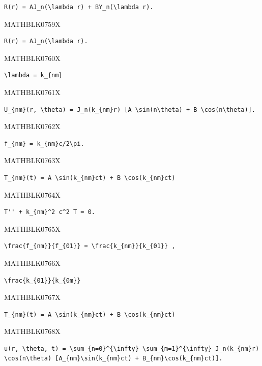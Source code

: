 \documentclass[
  ukrainian,
]{article}
\begin{document}
\begin{verbatim}
R(r) = AJ_n(\lambda r) + BY_n(\lambda r).
\end{verbatim}

MATHBLK0759X

\begin{verbatim}
R(r) = AJ_n(\lambda r).
\end{verbatim}

MATHBLK0760X

\begin{verbatim}
\lambda = k_{nm}
\end{verbatim}

MATHBLK0761X

\begin{verbatim}
U_{nm}(r, \theta) = J_n(k_{nm}r) [A \sin(n\theta) + B \cos(n\theta)].
\end{verbatim}

MATHBLK0762X

\begin{verbatim}
f_{nm} = k_{nm}c/2\pi.
\end{verbatim}

MATHBLK0763X

\begin{verbatim}
T_{nm}(t) = A \sin(k_{nm}ct) + B \cos(k_{nm}ct)
\end{verbatim}

MATHBLK0764X

\begin{verbatim}
T'' + k_{nm}^2 c^2 T = 0.
\end{verbatim}

MATHBLK0765X

\begin{verbatim}
\frac{f_{nm}}{f_{01}} = \frac{k_{nm}}{k_{01}} ,
\end{verbatim}

MATHBLK0766X

\begin{verbatim}
\frac{k_{01}}{k_{0m}}
\end{verbatim}

MATHBLK0767X

\begin{verbatim}
T_{nm}(t) = A \sin(k_{nm}ct) + B \cos(k_{nm}ct)
\end{verbatim}

MATHBLK0768X

\begin{verbatim}
u(r, \theta, t) = \sum_{n=0}^{\infty} \sum_{m=1}^{\infty} J_n(k_{nm}r) \cos(n\theta) [A_{nm}\sin(k_{nm}ct) + B_{nm}\cos(k_{nm}ct)].
\end{verbatim}
\end{document}
